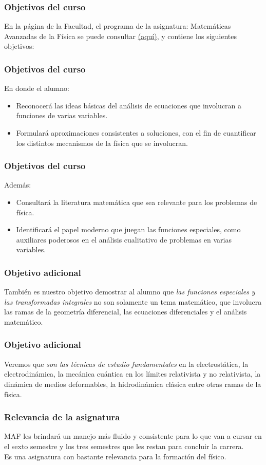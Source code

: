 \documentclass[12pt]{beamer}
\begin{document}
\begin{frame}
\frametitle{Objetivos del curso}
En la página de la Facultad, el programa de la asignatura: Matemáticas Avanzadas de la Física se puede consultar \href{http://www.fciencias.unam.mx/asignaturas/610.pdf}{(aquí)}, y contiene los siguientes objetivos:
\end{frame}
\begin{frame}
\frametitle{Objetivos del curso}
En donde el alumno:
\begin{itemize}[<+->]
\setlength{\itemsep}{0mm}
\item Reconocerá las ideas básicas del análisis de ecuaciones que involucran a funciones de varias variables.
\item Formulará aproximaciones consistentes a soluciones, con el fin de cuantificar los distintos mecanismos de la física que se involucran.
\end{itemize}
\end{frame}
\begin{frame}
\frametitle{Objetivos del curso}
Además:
\begin{itemize}[<+->]
\setlength{\itemsep}{0mm}
\item Consultará la literatura matemática que sea relevante para los problemas de física.
\item Identificará el papel moderno que juegan las funciones especiales, como auxiliares poderosos en el análisis cualitativo de problemas en varias variables.
\end{itemize}
\end{frame}
\begin{frame}
\frametitle{Objetivo adicional}
También es nuestro objetivo demostrar al alumno que \emph{las funciones especiales y las transformadas integrales} no son solamente un tema matemático, que involucra las ramas de la geometría diferencial, las ecuaciones diferenciales y el análisis matemático.
\end{frame}
\begin{frame}
\frametitle{Objetivo adicional}
Veremos que \emph{son las técnicas de estudio fundamentales} en la electrostática, la electrodinámica, la mecánica cuántica en los límites relativista y no relativista, la dinámica de medios deformables, la hidrodinámica clásica entre otras ramas de la física.
\end{frame}
\begin{frame}
\frametitle{Relevancia de la asignatura}
MAF les brindará un manejo más fluido y consistente para lo que van a cursar en el sexto semestre y los tres semestres que les restan para concluir la carrera.
\\
\bigskip
\pause
Es una asignatura con bastante relevancia para la formación del físico.
\end{frame}
\end{document}
